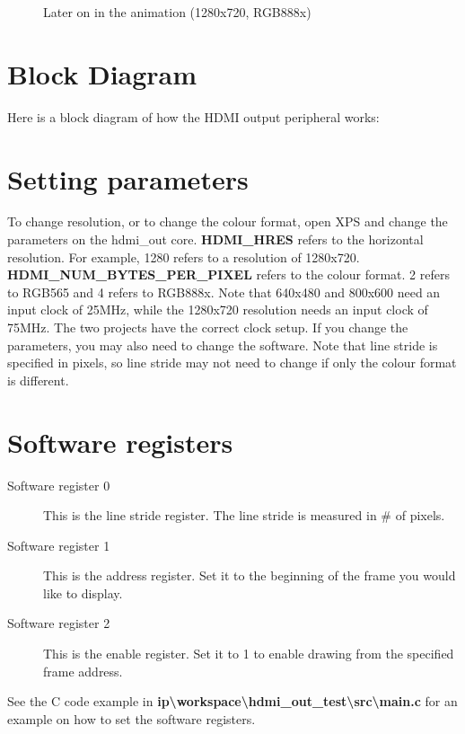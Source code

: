 \documentclass[12pt]{article}
\begin{document}
\begin{enumerate}
\begin{figure}[h!]
      \end{figure}
      \newpage
      \begin{figure}[h!]
        \centering
        \caption{Later on in the animation (1280x720, RGB888x)}
      \end{figure}
  \end{enumerate}
  \section{Block Diagram}
  Here is a block diagram of how the HDMI output peripheral works:
  \section{Setting parameters}
  To change resolution, or to change the colour format, open XPS and change the parameters on the hdmi\_out core. \textbf {HDMI\_HRES} refers to the horizontal resolution. For example, 1280 refers to a resolution of 1280x720. \textbf {HDMI\_NUM\_BYTES\_PER\_PIXEL} refers to the colour format. 2 refers to RGB565 and 4 refers to RGB888x. Note that 640x480 and 800x600 need an input clock of 25MHz, while the 1280x720 resolution needs an input clock of 75MHz. The two projects have the correct clock setup. If you change the parameters, you may also need to change the software. Note that line stride is specified in pixels, so line stride may not need to change if only the colour format is different.
  \section{Software registers}
  \begin{description}
    \item[Software register 0] This is the line stride register. The line stride is measured in \# of pixels.
    \item[Software register 1] This is the address register. Set it to the beginning of the frame you would like to display.
    \item[Software register 2] This is the enable register. Set it to 1 to enable drawing from the specified frame address.
  \end{description}
  See the C code example in \textbf {ip\textbackslash{}workspace\textbackslash{}hdmi\_out\_test\textbackslash{}src\textbackslash{}main.c} for an example on how to set the software registers.
\end{document}
